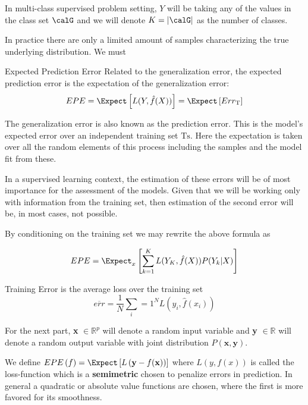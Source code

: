  In multi-class supervised problem setting, $Y$ will be taking any of the values in the class set $\calG$ and we will denote $K = |\calG|$ as the number of classes.
 
 
 In practice there are only a limited amount of samples characterizing the true underlying distribution. We must 
 
 \begin{definition}{Expected Prediction Error}
 	Related to the generalization error, the expected prediction error is the expectation of the generalization error:
 	$$ EPE = \Expect \left[ L(Y,\hat{f}(X))\right] =  \Expect \left[ Err_{\mathrm{T}}  \right]$$
 \end{definition}
 
 The generalization error is also known as the prediction error. This is the model's expected error over an independent training set $\mathrm{Ts}$. Here the expectation is taken over all the random elements of this process including the samples and the model fit from these. 
 
 In a supervised learning context, the estimation of these errors will be of most importance for the assessment of the models.  Given  that we will be working only with information from the training set, then estimation of the second error will be, in most cases, not possible.
 
 By conditioning on the training set we may rewrite the above formula as 
 
 \begin{equation}\label{classificationEPE}
 EPE = \Expect_x\left[ \sum_{k=1}^{K} L( Y_K , \hat{f}(X) ) P(Y_k|X) \right]
 \end{equation}
 
 
 \begin{definition}{Training Error}
 	is the average loss over the training set
 	$$ \overline{err} = \frac{1}{N} \sum_i=1^N L(y_i, \hat{f}(x_i) )$$
 \end{definition}
 
 
 For the next part, \textbf{x} $\in \mathbb{R}^{p}$ will denote a random input variable and \textbf{y}  $\in \mathbb{R}$ will denote a random output variable with joint distribution $P\left(\textbf{x},\textbf{y}\right)$.
 
 We define $EPE\left(f \right) = \Expect\left[L\left(\textbf{y} - f(\textbf{x}) \right) \right] $ where $L(y,f\left(x\right))$ is called the loss-function which is a \textbf{semimetric} chosen to penalize errors in prediction. In general a quadratic or absolute value functions are chosen, where the first is more favored for its smoothness. 
 
